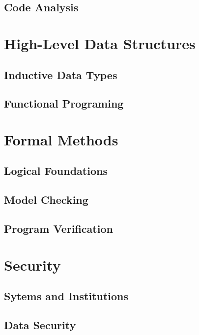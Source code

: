 \documentclass{book}
\begin{document}
  \chapter{Code Analysis}
    

\part{High-Level Data Structures}

  \chapter{Inductive Data Types}

  \chapter{Functional Programing}

\part{Formal Methods}

  \chapter{Logical Foundations}

  \chapter{Model Checking} %
    

  \chapter{Program Verification} %
   

\part{Security}

  \chapter{Sytems and Institutions}

  \chapter{Data Security}
    
\end{document}

